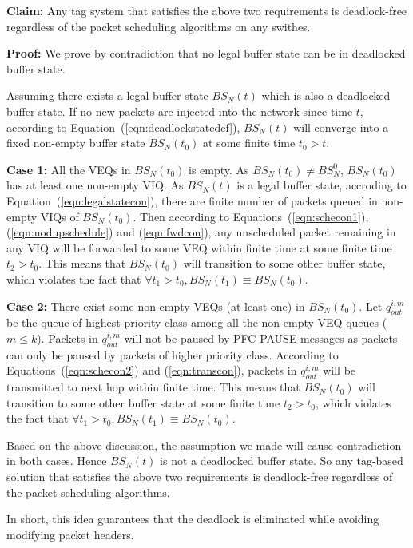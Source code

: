 

\textbf{Claim:} Any tag system that satisfies the above two requirements is deadlock-free regardless of the 
packet scheduling algorithms on any swithes.

\textbf{Proof:} We prove by contradiction that no legal buffer state can be in deadlocked buffer state.


Assuming there exists a legal buffer state $BS_N(t)$ which is also a deadlocked buffer state. If no new packets are injected into 
the network since time $t$, according to Equation~(\ref{eqn:deadlockstatedef}), $BS_N(t)$ will converge into a fixed non-empty 
buffer state $BS_N(t_0)$ at some finite time $t_0>t$. 


\textbf{Case 1:} All the VEQs in $BS_N(t_0)$ is empty. As $BS_N(t_0) \neq BS^0_N$, $BS_N(t_0)$ has at least one non-empty VIQ. 
As $BS_N(t)$ is a legal buffer state, accroding to Equation~(\ref{eqn:legalstatecon}), there are finite number of packets queued 
in non-empty VIQs of $BS_N(t_0)$. Then according to Equations~(\ref{eqn:schecon1}), (\ref{eqn:nodupschedule}) and (\ref{eqn:fwdcon}), 
any unscheduled packet remaining in any VIQ will be forwarded to some VEQ within finite time at some finite time $t_2>t_0$. 
This means that $BS_N(t_0)$ will transition to some other buffer state, which violates the fact that 
$\forall t_1>t_0, BS_N(t_1)\equiv BS_N(t_0)$.

\textbf{Case 2:} There exist some non-empty VEQs (at least one) in $BS_N(t_0)$. Let $q_{out}^{i,m}$ be the queue of highest priority 
class among all the non-empty VEQ queues ($m\leq k$). Packets in $q_{out}^{i,m}$ will not be paused 
by PFC PAUSE messages as packets can only be paused by packets of higher priority class. According to Equations~(\ref{eqn:schecon2}) 
and (\ref{eqn:transcon}), packets in $q_{out}^{i,m}$ will be transmitted to next hop within finite time. This means that $BS_N(t_0)$ 
will transition to some other buffer state at some finite time $t_2>t_0$, which violates the fact that 
$\forall t_1>t_0, BS_N(t_1)\equiv BS_N(t_0)$.

Based on the above discussion, the assumption we made will cause contradiction in both cases. Hence $BS_N(t)$ is not a deadlocked 
buffer state. So any tag-based solution that satisfies the above two requirements is deadlock-free regardless of the packet 
scheduling algorithms.

In short, this idea guarantees that the deadlock is eliminated while avoiding modifying packet headers.


